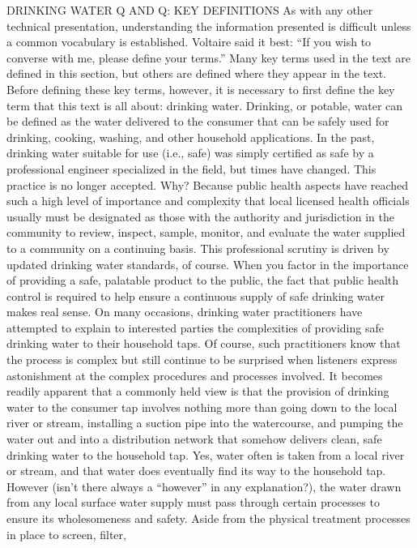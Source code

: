 \documentclass{article}
\begin{document}
DRINKING WATER Q AND Q: KEY DEFINITIONS As with any other technical
presentation, understanding the information presented is difficult
unless a common vocabulary is established. Voltaire said it best: ``If
you wish to converse with me, please define your terms.'' Many key terms
used in the text are defined in this section, but others are defined
where they appear in the text. Before defining these key terms, however,
it is necessary to first define the key term that this text is all
about: drinking water. Drinking, or potable, water can be defined as the
water delivered to the consumer that can be safely used for drinking,
cooking, washing, and other household applications. In the past,
drinking water suitable for use (i.e., safe) was simply certified as
safe by a professional engineer specialized in the field, but times have
changed. This practice is no longer accepted. Why? Because public health
aspects have reached such a high level of importance and complexity that
local licensed health officials usually must be designated as those with
the authority and jurisdiction in the community to review, inspect,
sample, monitor, and evaluate the water supplied to a community on a
continuing basis. This professional scrutiny is driven by updated
drinking water standards, of course. When you factor in the importance
of providing a safe, palatable product to the public, the fact that
public health control is required to help ensure a continuous supply of
safe drinking water makes real sense. On many occasions, drinking water
practitioners have attempted to explain to interested parties the
complexities of providing safe drinking water to their household taps.
Of course, such practitioners know that the process is complex but still
continue to be surprised when listeners express astonishment at the
complex procedures and processes involved. It becomes readily apparent
that a commonly held view is that the provision of drinking water to the
consumer tap involves nothing more than going down to the local river or
stream, installing a suction pipe into the watercourse, and pumping the
water out and into a distribution network that somehow delivers clean,
safe drinking water to the household tap. Yes, water often is taken from
a local river or stream, and that water does eventually find its way to
the household tap. However (isn't there always a ``however'' in any
explanation?), the water drawn from any local surface water supply must
pass through certain processes to ensure its wholesomeness and safety.
Aside from the physical treatment processes in place to screen, filter,
\end{document}
